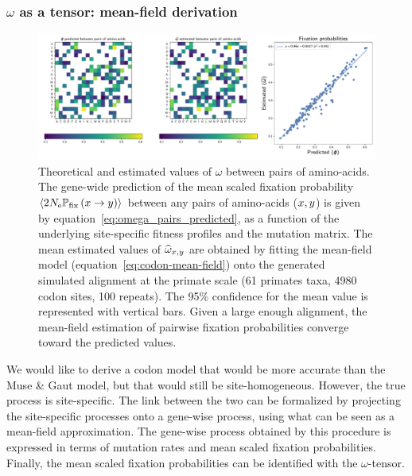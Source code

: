 \documentclass{article}
\begin{document}
\subsubsection{\texorpdfstring{$\omega$}{ω} as a tensor: mean-field derivation}

\begin{figure}[!htb]
 \centering
 \includegraphics[width=\linewidth, page=1]{inference_simulations/omega_MF}
 \caption[Estimation of fixation probability]{
 Theoretical and estimated values of $\omega$ between pairs of amino-acids.
 The gene-wide prediction of the mean scaled fixation probability $\left\langle 2 N_{\text{e}} \mathbb{P}_{\text{fix}} \left( x \to y \right) \right\rangle$ between any pairs of amino-acids ($x, y$) is given by equation~\ref{eq:omega_pairs_predicted}, as a function of the underlying site-specific fitness profiles and the mutation matrix.
 The mean estimated values of $\widehat{\omega}_{x, y}$ are obtained by fitting the mean-field model (equation~\ref{eq:codon-mean-field}) onto the generated simulated alignment at the primate scale (61 primates taxa, 4980 codon sites, 100 repeats). The 95\% confidence for the mean value is represented with vertical bars.
 Given a large enough alignment, the mean-field estimation of pairwise fixation probabilities converge toward the predicted values.
 }
 \label{fig:omega-inference}
\end{figure}

We would like to derive a codon model that would be more accurate than the Muse \& Gaut model, but that would still be site-homogeneous.
However, the true process is site-specific.
The link between the two can be formalized by projecting the site-specific processes onto a gene-wise process, using what can be seen as a mean-field approximation.
The gene-wise process obtained by this procedure is expressed in terms of mutation rates and mean scaled fixation probabilities.
Finally, the mean scaled fixation probabilities can be identified with the $\omega$-tensor.
\end{document}
